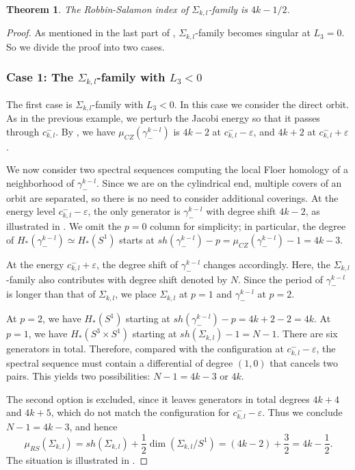 \documentclass{amsart}
\newcommand{\g}{\gamma}
\newcommand{\eps}{\varepsilon}
\newtheorem{thm}{Theorem}[section]
\begin{document}
\begin{thm}\label{Theorem - Index of Degenerate Orbits}
	The Robbin-Salamon index of $\Sigma_{k,l}$-family is $4k-1/2$.
\end{thm}
\begin{proof}
	As mentioned in the last part of , $\Sigma_{k,l}$-family becomes singular at $L_3=0$.
	So we divide the proof into two cases.
	\subsubsection*{Case 1: The $\Sigma_{k,l}$-family with $L_3 < 0$}
	The first case is $\Sigma_{k,l}$-family with $L_3<0$.
	In this case we consider the direct orbit. As in the previous example, we perturb the Jacobi energy so that it passes through $c_{k,l}^-$.  
	By , we have
	$\mu_{CZ}(\g_-^{k-l})$ is $4k - 2$ at $c_{k,l}^- - \eps$,
and $4k + 2$ at $c_{k,l}^- + \eps$.
	
	We now consider two spectral sequences computing the local Floer homology of a neighborhood of $\g_-^{k-l}$.  
	Since we are on the cylindrical end, multiple covers of an orbit are separated, so there is no need to consider additional coverings.
	At the energy level $c_{k,l}^- - \eps$, the only generator is $\g_-^{k-l}$ with degree shift $4k - 2$, as illustrated in .  
	We omit the $p=0$ column for simplicity; in particular, the degree of
	$
	H_{*}(\g_-^{k-l}) \simeq H_*(S^1)
$	starts at
	$sh(\g_-^{k-l}) - p
	= \mu_{CZ}(\g_-^{k-l}) - 1
	= 4k - 3.
	$
	
	At the energy $c_{k,l}^- + \varepsilon$, the degree shift of $\g_-^{k-l}$ changes accordingly.  
	Here, the $\Sigma_{k,l}$-family also contributes with degree shift denoted by $N$.  
	Since the period of $\g_-^{k-l}$ is longer than that of $\Sigma_{k,l}$, we place $\Sigma_{k,l}$ at $p=1$ and $\g_-^{k-l}$ at $p=2$.
	
	At $p=2$, we have $H_*(S^1)$ starting at $sh(\g_-^{k-l}) - p= 4k + 2 - 2 = 4k$.
	At $p=1$, we have
	$H_*(S^3 \times S^1)$ starting at $sh(\Sigma_{k,l}) - 1 = N - 1$.
	There are six generators in total.  
	Therefore, compared with the configuration at $c_{k,l}^- - \eps$, the spectral sequence must contain a differential of degree $(1,0)$ that cancels two pairs.  
	This yields two possibilities: $N-1=4k-3$ or $4k$.
	
	The second option is excluded, since it leaves generators in total degrees $4k+4$ and $4k+5$, which do not match the configuration for $c_{k,l}^- - \eps$.  
	Thus we conclude $N - 1 = 4k - 3$, and hence
	$$	\mu_{RS}(\Sigma_{k,l})
	=sh(\Sigma_{k,l})+\frac{1}{2} \dim (\Sigma_{k,l}/S^1)
	= (4k - 2) + \frac{3}{2}
	= 4k - \frac{1}{2}.
	$$
	The situation is illustrated in .
	

\end{proof}
\end{document}
